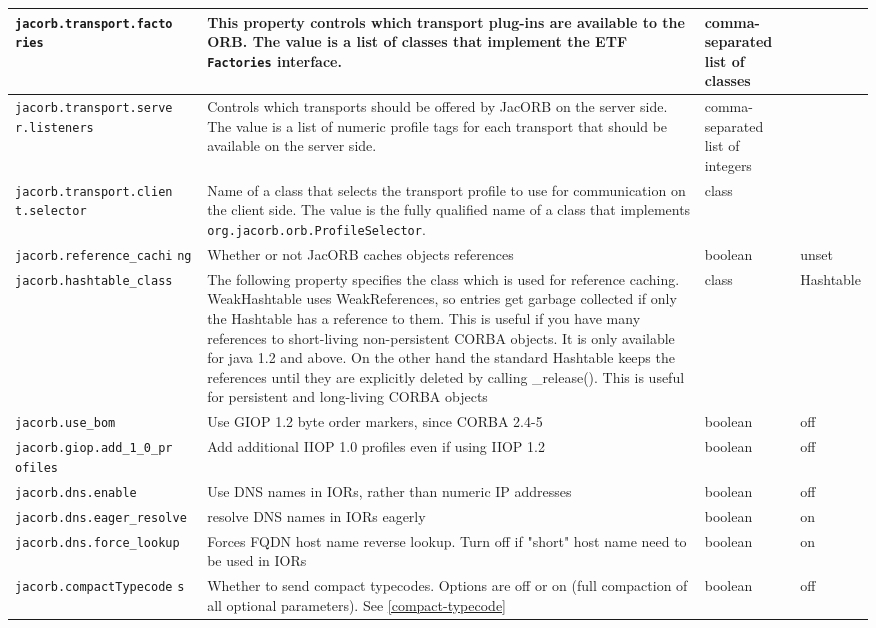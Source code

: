 \begin{small}
\begin{longtable}{|p{5cm}|p{7.5cm}|p{1.5cm}|p{1.5cm}|}
\verb"jacorb.transport.facto"
\verb"ries" & This property controls which transport plug-ins are
available to the ORB.  The value is a list of classes that implement the ETF
{\tt Factories} interface.
& comma-separated list of classes & \\
\hline
\verb"jacorb.transport.serve"
\verb"r.listeners" & Controls which transports should be offered by
JacORB on the server side.  The value is a list of numeric profile
tags for each transport that should be available on the server side.
& comma-separated list of integers & \\
\hline
\verb"jacorb.transport.clien"
\verb"t.selector" & Name of a class that selects the transport profile
to use for communication on the client side.  The value is the fully
qualified name of a class that implements {\tt
  org.jacorb.orb.ProfileSelector}.
& class & \\
\hline
\verb"jacorb.reference_cachi"
\verb"ng" & Whether or not JacORB caches objects references & boolean & unset  \\
\hline
\verb"jacorb.hashtable_class" & The following property specifies the
class which is used for reference caching. WeakHashtable uses
WeakReferences, so entries get garbage collected if only the Hashtable
has a reference to them. This is useful if you have many references to
short-living non-persistent CORBA objects. It is only available for
java 1.2 and above. On the other hand the standard Hashtable keeps the
references until they are explicitly deleted by calling
\_release(). This is useful for persistent and long-living CORBA
objects & class & Hashtable \\
\hline
\verb"jacorb.use_bom" & Use GIOP 1.2 byte order markers, since CORBA
2.4-5 & boolean & off  \\
\hline
\verb"jacorb.giop.add_1_0_pr"
\verb"ofiles" & Add additional IIOP 1.0 profiles even if using IIOP
1.2 & boolean & off \\
\hline
\verb"jacorb.dns.enable" & Use DNS names in IORs, rather than numeric
IP addresses & boolean & off \\
\hline
\verb"jacorb.dns.eager_resolve" & resolve DNS names in IORs eagerly & boolean & on \\
\hline
\verb"jacorb.dns.force_lookup" & Forces FQDN host name reverse lookup.
Turn off if "short" host name need to be used in IORs & boolean & on \\
\hline
\verb"jacorb.compactTypecode"
\verb"s" & Whether to send compact typecodes. Options are off or on (full compaction of all optional parameters). See \ref{compact-typecode} & boolean & off \\

\end{longtable}
\end{small}
